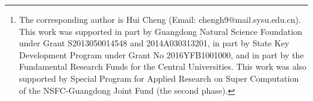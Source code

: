 \documentclass{sig-alternate-05-2015}
\begin{document}
\author{
\alignauthor
Keze Wang$^{1, 2}$, Shengfu Zhai$^{1, 2}$, Hui Cheng$^{1, 2}$\thanks{The corresponding author is Hui Cheng (Email: chengh9@mail.sysu.edu.cn). This work was supported in part by Guangdong Natural Science Foundation under Grant S2013050014548 and 2014A030313201, in part by State Key Development Program under Grant No 2016YFB1001000, and in part by the Fundamental Research Funds for the Central Universities. This work was also supported by Special Program for Applied Research on Super Computation of the NSFC-Guangdong Joint Fund (the second phase).}, Xiaodan Liang$^{1, 2}$, Liang Lin$^{1, 2}$ \\
\affaddr $^1$Sun Yat-Sen University, Guangzhou, China \\
$^2$Collaborative Innovation Center of High Performance Computing, \\
National University of Defense Technology, Changsha 410073, China
%
}

\end{document}
